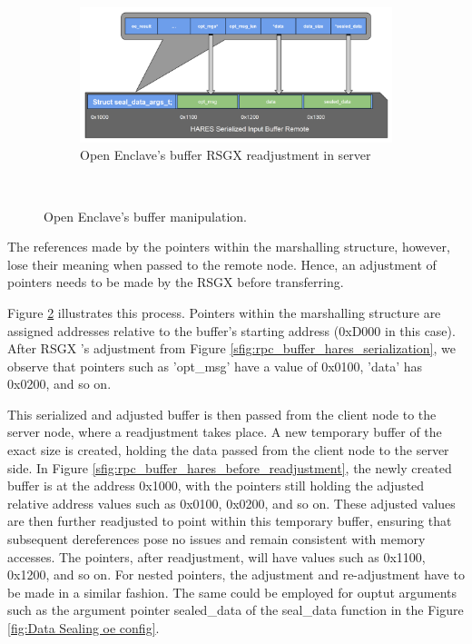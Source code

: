 \documentclass[article, doublespace,nopageskip]{VTthesis} %
\newcommand{\monitor}{RSGX \xspace}
\begin{document}
{\begin{figure}[H]
        \\[30pt]
        \begin{subfigure}{\textwidth}
            \centering
            \includegraphics[scale=0.4]{figures/rpc_buffer_hares_after_readjustment.png}
            \caption{Open Enclave's buffer \monitor readjustment in server}
            \label{sfig:rpc_buffer_hares_after_readjustment}
        \end{subfigure}
        \\[20pt]
        \caption{Open Enclave's buffer manipulation.}
        \label{fig:HARES-Serialization}
    \end{figure}
}

    The references made by the pointers within the marshalling structure, however, lose their meaning when passed to the remote node. Hence, an adjustment of pointers needs to be made by the \monitor before transferring. 
    
    Figure \ref{fig:HARES-Serialization} illustrates this process. Pointers within the marshalling structure are assigned addresses relative to the buffer's starting address (0xD000 in this case). After \monitor's adjustment from Figure \ref{sfig:rpc_buffer_hares_serialization}, we observe that pointers such as 'opt\_msg' have a value of 0x0100, 'data' has 0x0200, and so on.
    
    This serialized and adjusted buffer is then passed from the client node to the server node, where a readjustment takes place. A new temporary buffer of the exact size is created, holding the data passed from the client node to the server side. In Figure \ref{sfig:rpc_buffer_hares_before_readjustment}, the newly created buffer is at the address 0x1000, with the pointers still holding the adjusted relative address values such as 0x0100, 0x0200, and so on. These adjusted values are then further readjusted to point within this temporary buffer, ensuring that subsequent dereferences pose no issues and remain consistent with memory accesses. The pointers, after readjustment, will have values such as 0x1100, 0x1200, and so on. For nested pointers, the adjustment and re-adjustment have to be made in a similar fashion. The same could be employed for ouptut arguments such as the argument pointer sealed\_data of the seal\_data function in the Figure \ref{fig:Data Sealing oe config}.
\end{document}
